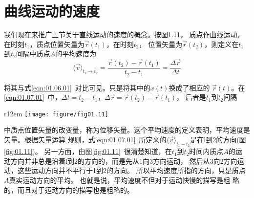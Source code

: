 \documentclass[../outline-of-mechanics.tex]{subfiles}
\begin{document}
\section{曲线运动的速度}\label{sec:01.07}

我们现在来推广上节关于直线运动的速度的概念。按图1.11，
质点作曲线运动，在时刻$t_1$，质点位置矢量为$\vec{r}\left(t_1\right)$，在时刻$t_2$，
位置矢量为$\vec{r}\left(t_2\right)$，则定义在$t_1$到$t_2$间隔中质点$ A $的平均速度为
\begin{equation}\label{eqn:01.07.01}
  \langle \vec{v} \rangle_{t_1\rightarrow t_2}=\frac{\vec{r}\left(t_2\right)-\vec{r}\left(t_1\right)}{t_2-t_1}=\frac{\Delta \vec{r}}{\Delta t}
\end{equation}

\clearpage\noindent 将其与式\eqref{eqn:01.06.01}~对比可见。只是将其中的$x\left(t\right)$换成了相应的
$\vec{r}\left(t\right)$。在\eqref{eqn:01.07.01}~中，$\Delta t=t_2-t_1$，$\Delta \vec{r}=\vec{r}\left(t_2\right)-\vec{r}\left(t_1\right)$，
后者是$t_1$到$t_2$间隔
\begin{wrapfigure}[8]{r}{12em}
  \centering
  \small
  \texttt{[image: figure/fig01.11]}
  \caption{曲线运动的速度}
  \label{fig:01.11}
\end{wrapfigure}
中质点位置矢量的改变量，称为位移矢量。这个平均速度的定义表明，平均速度是矢量。根据矢量运算
规则，式\eqref{eqn:01.07.01}~所定义的$\langle \vec{v}\rangle_{t_1-t_2}$是在l到2的方向(图\ref{fig:01.11})。
另一方面，由图\ref{fig:01.11}~很清楚知道，在$t_1$到$t_2$时间内质点$A$的运
动方向并非总是沿着l到2的方向的，而是先从1向3方向运动，
然后从3向2方向运动，这些运动方向并不平行于1到2的方向。
所以平均速度所指的方向，只是质点$A$真实运动方向的平均。
也就是说，平均速度不但对于运动快慢的描写是粗
略的，而且对于运动方向的描写也是粗略的。
\end{document}
